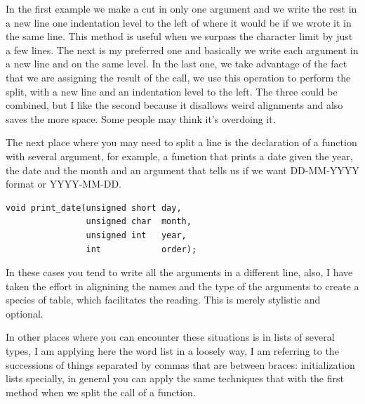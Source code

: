 \documentclass[a4paper]{article}
\begin{document}
In the first example we make a cut in only one argument and we write the rest in
a new line one indentation level to the left of where it would be if we wrote it
in the same line. This method is useful when we surpass the character limit by
just a few lines. The next is my preferred one and basically we write each
argument in a new line and on the same level. In the last one, we take advantage
of the fact that we are assigning the result of the call, we use this operation
to perform the split, with a new line and an indentation level to the left.
The three could be combined, but I like the second because it disallows weird
alignments and also saves the more space. Some people may think it's overdoing
it.

The next place where you may need to split a line is the declaration of a
function with several argument, for example, a function that prints a date given
the year, the date and the month and an argument that tells us if we want
DD-MM-YYYY format or YYYY-MM-DD.

\noindent
\begin{minipage}[H]{\linewidth}
\mbox{}
\begin{lstlisting}[style=C,
caption={Splitting of function declaration},
label={lst:functionShorting}]
void print_date(unsigned short day,
                unsigned char  month,
                unsigned int   year,
                int            order);
\end{lstlisting}
\end{minipage}

In these cases you tend to write all the arguments in a different line, also,
I have taken the effort in alignining the names and the type of the arguments to
create a species of table, which facilitates the reading. This is merely
stylistic and optional.

In other places where you can encounter these situations is in lists of several
types, I am applying here the word list in a loosely way, I am referring to the
successions of things separated by commas that are between braces:
initialization lists specially, in general you can apply the same techniques
that with the first method when we split the call of a function.
\end{document}
